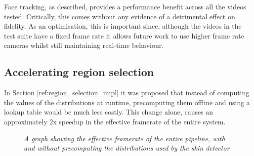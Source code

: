 Face tracking, as described, provides a performance benefit across all the videos tested.
Critically, this comes without any evidence of a detrimental effect on fidelity. As an optimisation, this
is important since, although the videos in the test suite have a fixed frame rate it allows future work to 
use higher frame rate cameras whilst still maintaining real-time behaviour. 

\subsection{Accelerating region selection}
\label{eval:region_selection}
In Section \ref{ref:region_selection_impl} it was proposed that instead of computing the values of the distributions at runtime, precomputing them offline and using a lookup table
would be much less costly. This change alone, causes an approximately 2x speedup in the effective framerate of the entire system.
\begin{figure}[H]
    \centering
    \scalebox{0.5}{}
   \caption{\textit{A graph showing the effective framerate of the entire pipeline, with and without precomputing the distributions used by the skin detector}} 
\end{figure}



